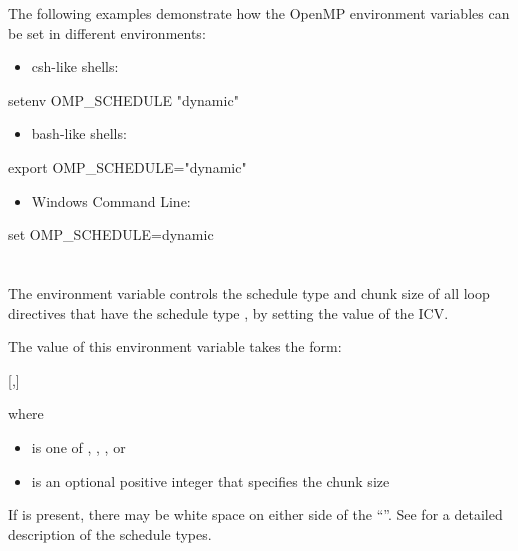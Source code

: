 The following examples demonstrate how the OpenMP environment variables can
be set in different environments:

\begin{itemize}
\item csh-like shells:
\end{itemize}

\begin{boxedcode}
setenv OMP\_SCHEDULE "dynamic"
\end{boxedcode}

\begin{itemize}
\item bash-like shells:
\end{itemize}

\begin{boxedcode}
export OMP\_SCHEDULE="dynamic"
\end{boxedcode}

\begin{itemize}
\item Windows Command Line:
\end{itemize}

\begin{boxedcode}
set OMP\_SCHEDULE=dynamic
\end{boxedcode}


\section{}
\label{sec:OMP_SCHEDULE}
The  environment variable controls the schedule type and chunk size 
of all loop directives that have the schedule type , by setting the value of the 
 ICV.

The value of this environment variable takes the form:

[,]

where

\begin{itemize}
\item {} is one of , , , or 

\item {} is an optional positive integer that specifies the chunk size
\end{itemize}

If  is present, there may be white space on either side of the ``\code{,}''. See 
 for a detailed description of the schedule types.

